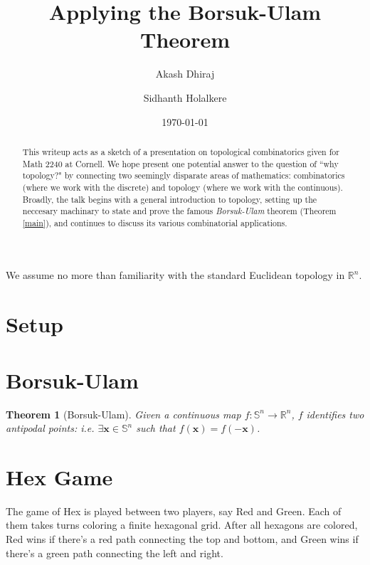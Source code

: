 \documentclass[12pt]{amsart}
\newtheorem{thm}{Theorem}[section]
\theoremstyle{definition}
\begin{document}
    \title{Applying the Borsuk-Ulam Theorem}
    \author{Akash Dhiraj}
    \author{Sidhanth Holalkere}
    \email{}
    \date{\today}

    \begin{abstract}
        This writeup acts as a sketch of a presentation on topological combinatorics given for Math 2240 at Cornell. We hope present one potential answer to the question of ``why topology?" by connecting two seemingly disparate areas of mathematics: combinatorics (where we work with the discrete) and topology (where we work with the continuous). Broadly, the talk begins with a general introduction to topology, setting up the neccesary machinary to state and prove the famous \emph{Borsuk-Ulam} theorem (Theorem \ref{main}), and continues to discuss its various combinatorial applications. 
    \end{abstract}

    \maketitle

    We assume no more than familiarity with the standard Euclidean topology in $\mathbb R^n$.

    \section{Setup}

    \newpage

    \section{Borsuk-Ulam}

    \begin{thm}[Borsuk-Ulam]
        \label{main}
        Given a continuous map $f: \mathbb S^n \to \mathbb R^n$, $f$ identifies two antipodal points: i.e. $\exists \mathbf x \in \mathbb S^n$ such that $f(\mathbf x) = f(-\mathbf x)$.
    \end{thm}

    \newpage

    \section{Hex Game}

    The game of Hex is played between two players, say Red and Green. Each of them takes turns coloring a finite hexagonal grid. After all hexagons are colored, Red wins if there's a red path connecting the top and bottom, and Green wins if there's a green path connecting the left and right. 
\end{document}
